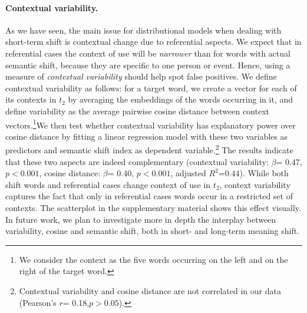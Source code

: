 \paragraph{Contextual variability.}


As we have seen, the main issue for distributional models when dealing
with short-term shift is contextual change due to referential aspects.
We expect that in referential cases the context of use will be \textit{narrower} than 
for words with actual semantic shift, because they are specific to one person or event. Hence, using a measure of \textit{contextual variability} should
help spot false positives. 
We define contextual variability as follows: for a target word, we create a vector for each of its contexts in $t_2$ by averaging the embeddings of the words  occurring in it, and define variability as the average pairwise cosine distance between context vectors.\footnote{We consider the context as the five words occurring on the left and on the right of the target word.}We then test whether contextual variability has explanatory power over cosine distance by fitting a linear regression model with these two variables as predictors and semantic shift index as dependent variable.\footnote{Contextual variability and cosine distance are not correlated in our data (Pearson's $r$= 0.18,$p> 0.05$). }
The results indicate that these two aspects are indeed complementary (contextual variability: $\beta$= 0.47, $p< 0.001$, cosine distance: $\beta$= 0.40, $p< 0.001$, adjusted $R^2$=0.44). While both shift words and referential cases change context of use in $t_2$, context variability captures the fact that only in referential cases words occur in a restricted set of contexts. The scatterplot in the supplementary material shows this effect visually. In future work, we plan to investigate more in depth the interplay between variability, cosine and semantic shift, both in short- and long-term meaning shift.


